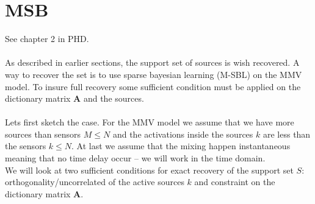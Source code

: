 \section{MSB}\label{sec:M-SBL}
See chapter 2 in PHD.
\\ \\
As described in earlier sections, the support set of sources is wish recovered. A way to recover the set is to use sparse bayesian learning (M-SBL) on the MMV model. To insure full recovery some sufficient condition must be applied on the dictionary matrix $\mathbf{A}$ and the sources. 
\\ \\
Lets first sketch the case. For the MMV model we assume that we have more sources than sensors $M \leq N$ and the activations inside the sources $k$ are less than the sensors $k \leq N$. At last we assume that the mixing happen instantaneous meaning that no time delay occur -- we will work in the time domain.
\\
We will look at two sufficient conditions for exact recovery of the support set $S$: orthogonality/uncorrelated of the active sources $k$ and constraint on the dictionary matrix $\mathbf{A}$.

